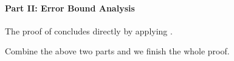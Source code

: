 \paragraph{Part II: Error Bound Analysis}

The proof of  concludes directly by applying .

Combine the above two parts and we finish the whole proof.

